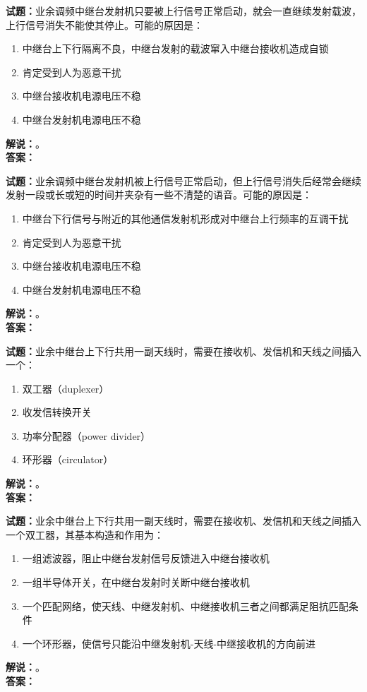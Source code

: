 \documentclass{ctexbook}
\begin{document}
\noindent\textbf{试题：}业余调频中继台发射机只要被上行信号正常启动，就会一直继续发射载波，上行信号消失不能使其停止。可能的原因是：
\begin{enumerate}[leftmargin=3em]
  \item 中继台上下行隔离不良，中继台发射的载波窜入中继台接收机造成自锁
  \item 肯定受到人为恶意干扰
  \item 中继台接收机电源电压不稳
  \item 中继台发射机电源电压不稳
\end{enumerate}
\noindent\textbf{解说：}\textbf{}。\\\noindent\textbf{答案：}

\vspace{\baselineskip}

\noindent\textbf{试题：}业余调频中继台发射机被上行信号正常启动，但上行信号消失后经常会继续发射一段或长或短的时间并夹杂有一些不清楚的语音。可能的原因是：
\begin{enumerate}[leftmargin=3em]
  \item 中继台下行信号与附近的其他通信发射机形成对中继台上行频率的互调干扰
  \item 肯定受到人为恶意干扰
  \item 中继台接收机电源电压不稳
  \item 中继台发射机电源电压不稳
\end{enumerate}
\noindent\textbf{解说：}\textbf{}。\\\noindent\textbf{答案：}

\vspace{\baselineskip}

\noindent\textbf{试题：}业余中继台上下行共用一副天线时，需要在接收机、发信机和天线之间插入一个：
\begin{enumerate}[leftmargin=3em]
  \item 双工器（duplexer）
  \item 收发信转换开关
  \item 功率分配器（power divider）
  \item 环形器（circulator）
\end{enumerate}
\noindent\textbf{解说：}\textbf{}。\\\noindent\textbf{答案：}

\vspace{\baselineskip}

\noindent\textbf{试题：}业余中继台上下行共用一副天线时，需要在接收机、发信机和天线之间插入一个双工器，其基本构造和作用为：
\begin{enumerate}[leftmargin=3em]
  \item 一组滤波器，阻止中继台发射信号反馈进入中继台接收机
  \item 一组半导体开关，在中继台发射时关断中继台接收机
  \item 一个匹配网络，使天线、中继发射机、中继接收机三者之间都满足阻抗匹配条件
  \item 一个环形器，使信号只能沿中继发射机-天线-中继接收机的方向前进
\end{enumerate}
\noindent\textbf{解说：}\textbf{}。\\\noindent\textbf{答案：}
\end{document}
